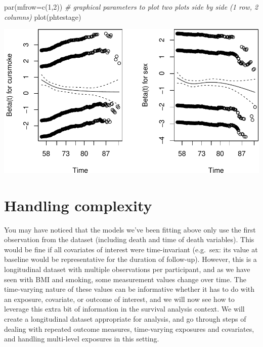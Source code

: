 \documentclass[
]{book}
\newenvironment{Shaded}{\begin{snugshade}}{\end{snugshade}}
\newcommand{\AttributeTok}[1]{\textcolor[rgb]{0.77,0.63,0.00}{#1}}
\newcommand{\CommentTok}[1]{\textcolor[rgb]{0.56,0.35,0.01}{\textit{#1}}}
\newcommand{\DecValTok}[1]{\textcolor[rgb]{0.00,0.00,0.81}{#1}}
\newcommand{\FunctionTok}[1]{\textcolor[rgb]{0.00,0.00,0.00}{#1}}
\newcommand{\NormalTok}[1]{#1}
\begin{document}
\begin{Shaded}
\begin{Highlighting}[]
\FunctionTok{par}\NormalTok{(}\AttributeTok{mfrow=}\FunctionTok{c}\NormalTok{(}\DecValTok{1}\NormalTok{,}\DecValTok{2}\NormalTok{)) }\CommentTok{\# graphical parameters to plot two plots side by side (1 row, 2 columns)}
\FunctionTok{plot}\NormalTok{(phtestage)}
\end{Highlighting}
\end{Shaded}

\includegraphics{adv_epi_analysis_files/figure-latex/unnamed-chunk-217-1.pdf}

\hypertarget{handling-complexity}{%
\section{Handling complexity}\label{handling-complexity}}

You may have noticed that the models we've been fitting above only use the first observation from the dataset (including death and time of death variables). This would be fine if all covariates of interest were time-invariant (e.g.~sex: its value at baseline would be representative for the duration of follow-up). However, this is a longitudinal dataset with multiple observations per participant, and as we have seen with BMI and smoking, some measurement values change over time. The time-varying nature of these values can be informative whether it has to do with an exposure, covariate, or outcome of interest, and we will now see how to leverage this extra bit of information in the survival analysis context. We will create a longitudinal dataset appropriate for analysis, and go through steps of dealing with repeated outcome measures, time-varying exposures and covariates, and handling multi-level exposures in this setting.
\end{document}

